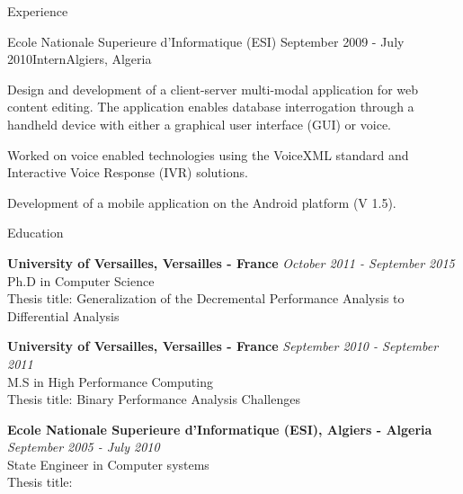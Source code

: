 \documentclass{resume} %
\begin{document}
\begin{rSection}{Experience}
\begin{rSubsection}{Ecole Nationale Superieure d'Informatique (ESI)}
                   {September 2009 - July 2010}{Intern}{Algiers, Algeria}
\item Design and development of a client-server multi-modal application for web 
      content editing. The application enables database interrogation through a 
      handheld device with either a graphical user interface (GUI) or voice.
\item Worked on voice enabled technologies using the VoiceXML standard and 
      Interactive Voice Response (IVR) solutions.
\item Development of a mobile application on the Android platform (V 1.5).  
\end{rSubsection}


\begin{rSection}{Education}

{\bf University of Versailles, Versailles - France} \hfill {\em October 2011 - September 2015} \\ 
Ph.D in Computer Science\\
Thesis title: Generalization of the Decremental Performance Analysis to Differential Analysis

{\bf University of Versailles, Versailles - France} \hfill {\em September 2010 - September 2011} \\ 
M.S in High Performance Computing\\
Thesis title: Binary Performance Analysis Challenges

{\bf Ecole Nationale Superieure d'Informatique (ESI), Algiers - Algeria} \hfill {\em September 2005 - July 2010} \\ 
State Engineer in Computer systems\\
Thesis title:  
\end{rSection}





\end{rSection}
\end{document}
